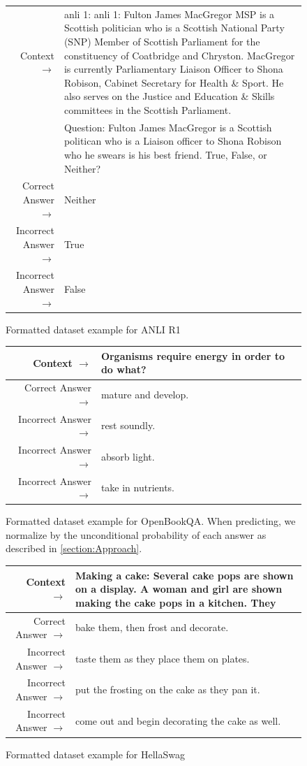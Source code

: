 \begin{figure} { \tt \footnotesize \begin{tabularx}{\linewidth}{r X} \toprule Context $\to$ & anli 1: anli 1: Fulton James MacGregor MSP is a Scottish politician who is a Scottish National Party (SNP) Member of Scottish Parliament for the constituency of Coatbridge and Chryston. MacGregor is currently Parliamentary Liaison Officer to Shona Robison, Cabinet Secretary for Health \& Sport. He also serves on the Justice and Education \& Skills committees in the Scottish Parliament. \\ 
 & Question: Fulton James MacGregor is a Scottish politican who is a Liaison officer to Shona Robison who he swears is his best friend. True, False, or Neither? \\ 
 \midrule Correct Answer $\to$ & Neither \\ 
 Incorrect Answer $\to$ & True \\ 
 Incorrect Answer $\to$ & False\\ \bottomrule \end{tabularx} }  \caption{Formatted dataset example for ANLI R1}  \label{eval:ANLI R1}  \end{figure}%
\begin{figure} { \tt \footnotesize \begin{tabularx}{\linewidth}{r X} \toprule Context $\to$ & Organisms require energy in order to do what? \\ 
 \midrule Correct Answer $\to$ & mature and develop. \\ 
 Incorrect Answer $\to$ & rest soundly. \\ 
 Incorrect Answer $\to$ & absorb light. \\ 
 Incorrect Answer $\to$ & take in nutrients.\\ \bottomrule \end{tabularx} }  \caption{Formatted dataset example for OpenBookQA. When predicting, we normalize by the unconditional probability of each answer as described in \ref{section:Approach}.}  \label{eval:OpenBookQA}  \end{figure}%
\begin{figure} { \tt \footnotesize \begin{tabularx}{\linewidth}{r X} \toprule Context $\to$ & Making a cake: Several cake pops are shown on a display. A woman and girl are shown making the cake pops in a kitchen. They \\ 
 \midrule Correct Answer $\to$ & bake them, then frost and decorate. \\ 
 Incorrect Answer $\to$ & taste them as they place them on plates. \\ 
 Incorrect Answer $\to$ & put the frosting on the cake as they pan it. \\ 
 Incorrect Answer $\to$ & come out and begin decorating the cake as well.\\ \bottomrule \end{tabularx} }  \caption{Formatted dataset example for HellaSwag}  \label{eval:HellaSwag}  \end{figure}%
